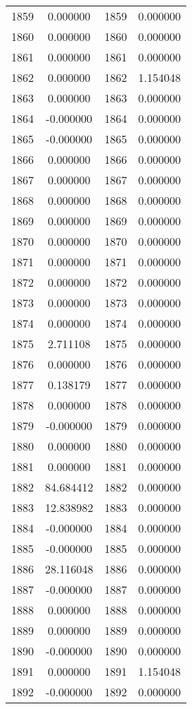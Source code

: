 \documentclass[12pt]{article}
\begin{document}
\begin{longtable}{@{}cccc@{}}
1859 & 0.000000 & 1859 & 0.000000 \\
1860 & 0.000000 & 1860 & 0.000000 \\
1861 & 0.000000 & 1861 & 0.000000 \\
1862 & 0.000000 & 1862 & 1.154048 \\
1863 & 0.000000 & 1863 & 0.000000 \\
1864 & -0.000000 & 1864 & 0.000000 \\
1865 & -0.000000 & 1865 & 0.000000 \\
1866 & 0.000000 & 1866 & 0.000000 \\
1867 & 0.000000 & 1867 & 0.000000 \\
1868 & 0.000000 & 1868 & 0.000000 \\
1869 & 0.000000 & 1869 & 0.000000 \\
1870 & 0.000000 & 1870 & 0.000000 \\
1871 & 0.000000 & 1871 & 0.000000 \\
1872 & 0.000000 & 1872 & 0.000000 \\
1873 & 0.000000 & 1873 & 0.000000 \\
1874 & 0.000000 & 1874 & 0.000000 \\
1875 & 2.711108 & 1875 & 0.000000 \\
1876 & 0.000000 & 1876 & 0.000000 \\
1877 & 0.138179 & 1877 & 0.000000 \\
1878 & 0.000000 & 1878 & 0.000000 \\
1879 & -0.000000 & 1879 & 0.000000 \\
1880 & 0.000000 & 1880 & 0.000000 \\
1881 & 0.000000 & 1881 & 0.000000 \\
1882 & 84.684412 & 1882 & 0.000000 \\
1883 & 12.838982 & 1883 & 0.000000 \\
1884 & -0.000000 & 1884 & 0.000000 \\
1885 & -0.000000 & 1885 & 0.000000 \\
1886 & 28.116048 & 1886 & 0.000000 \\
1887 & -0.000000 & 1887 & 0.000000 \\
1888 & 0.000000 & 1888 & 0.000000 \\
1889 & 0.000000 & 1889 & 0.000000 \\
1890 & -0.000000 & 1890 & 0.000000 \\
1891 & 0.000000 & 1891 & 1.154048 \\
1892 & -0.000000 & 1892 & 0.000000 \\

\end{longtable}
\end{document}
